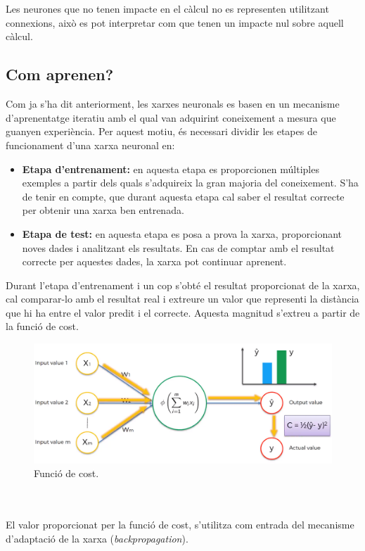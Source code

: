 \documentclass[12pt]{article}
\begin{document}
\\\\Les neurones que no tenen impacte en el càlcul no es representen utilitzant connexions, això es pot interpretar com que tenen un impacte nul sobre aquell càlcul.

\clearpage
\subsection{Com aprenen?}
Com ja s'ha dit anteriorment, les xarxes neuronals es basen en un mecanisme d'aprenentatge iteratiu amb el qual van adquirint coneixement a mesura que guanyen experiència. Per aquest motiu, és necessari dividir les etapes de funcionament d'una xarxa neuronal en:
\begin{itemize}
	\item \textbf{Etapa d'entrenament:} en aquesta etapa es proporcionen múltiples exemples a partir dels quals s'adquireix la gran majoria del coneixement. S'ha de tenir en compte, que durant aquesta etapa cal saber el resultat correcte per obtenir una xarxa ben entrenada.
	\item \textbf{Etapa de test:} en aquesta etapa es posa a prova la xarxa, proporcionant noves dades i analitzant els resultats. En cas de comptar amb el resultat correcte per aquestes dades, la xarxa pot continuar aprenent.
\end{itemize}
Durant l'etapa d'entrenament i un cop s'obté el resultat proporcionat de la xarxa, cal comparar-lo amb el resultat real i extreure un valor que representi la distància que hi ha entre el valor predit i el correcte. Aquesta magnitud s'extreu a partir de la funció de cost. 
\begin{figure}[h!]
	\centering
	\includegraphics[scale=0.3]{imatges/aprendre/1aprendre.png}
	\caption{Funció de cost.}
\end{figure}
\\\\El valor proporcionat per la funció de cost, s'utilitza com entrada del mecanisme d'adaptació de la xarxa (\textit{backpropagation}).
\end{document}
